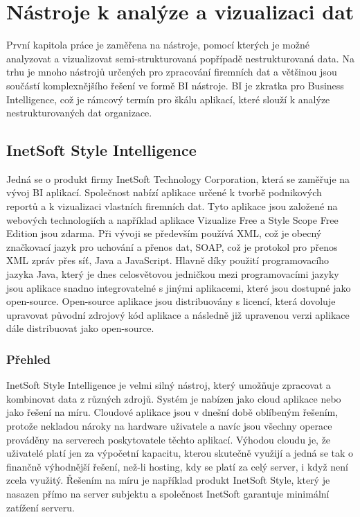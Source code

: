 \documentclass[czech,BP]{thesiskiv}
\begin{document}
\chapter{Nástroje k analýze a vizualizaci dat }
\label{Nástroje_1}
První kapitola práce je zaměřena na nástroje, pomocí kterých je možné analyzovat a vizualizovat semi-strukturovaná popřípadě nestrukturovaná data. Na trhu je mnoho nástrojů určených pro zpracování firemních dat a většinou jsou součástí komplexnějšího řešení ve formě BI nástroje. BI je zkratka pro Business Intelligence, což je rámcový termín pro škálu aplikací, které slouží k analýze nestrukturovaných dat organizace.\cite{BI}

\section{InetSoft Style Intelligence}
Jedná se o produkt firmy InetSoft Technology Corporation, která  se zaměřuje na vývoj BI aplikací. Společnost nabízí aplikace určené k tvorbě podnikových reportů a k vizualizaci vlastních firemních dat. Tyto aplikace jsou založené na webových technologiích a například aplikace Vizualize Free a Style Scope Free Edition jsou zdarma. Při vývoji se především používá XML, což je obecný značkovací jazyk pro uchování a přenos dat, SOAP, což je protokol pro přenos XML zpráv přes síť, Java a JavaScript\cite{InetTechnology}. Hlavně díky použití programovacího jazyka Java, který je dnes celosvětovou jedničkou mezi programovacími jazyky \cite{JavaStandings} jsou aplikace snadno integrovatelné s jinými aplikacemi, které jsou dostupné jako open-source. Open-source aplikace jsou distribuovány s licencí, která dovoluje upravovat původní zdrojový kód aplikace a následně již upravenou verzi aplikace dále distribuovat jako open-source.

\subsection{Přehled}
InetSoft Style Intelligence je velmi silný nástroj, který umožňuje zpracovat a kombinovat data z různých zdrojů. Systém je nabízen jako cloud aplikace nebo jako řešení na míru. Cloudové aplikace jsou v dnešní době oblíbeným řešením, protože nekladou nároky na hardware uživatele a navíc jsou všechny operace prováděny na serverech poskytovatele těchto aplikací. Výhodou cloudu je, že uživatelé platí jen za výpočetní kapacitu, kterou skutečně využijí a jedná se tak o finančně výhodnější řešení, než-li hosting, kdy se platí za celý server, i když není zcela využitý. Řešením na míru je například produkt InetSoft Style, který je nasazen přímo na server subjektu a společnost InetSoft garantuje minimální zatížení serveru.
\end{document}
